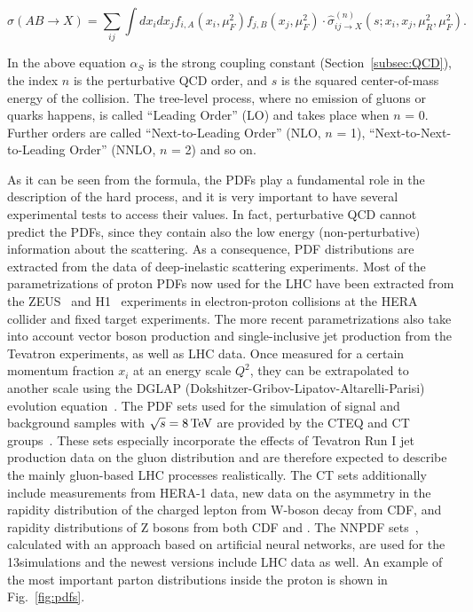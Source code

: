 \begin{equation}
\sigma(AB \to X) = \sum_{ij}\int dx_i dx_j f_{i,A}(x_i,\mu_F^2) f_{j,B}(x_j,\mu_F^2) \cdot \hat{\sigma}^{(n)}_{ij\to X}(s;x_i,x_j,\mu_R^2,\mu_F^2).
\end{equation}

In the above equation $\alpha_S$ is the strong coupling constant (Section~\ref{subsec:QCD}), the index $n$ is the perturbative QCD order, and $s$ is the squared center-of-mass energy of the collision.
The tree-level process, where no emission of gluons or quarks happens, is called ``Leading Order'' (LO) and takes place when $n$ = 0.
Further orders are called ``Next-to-Leading Order'' (NLO, $n$ = 1), ``Next-to-Next-to-Leading Order'' (NNLO, $n$ = 2) and so on.

As it can be seen from the formula, the PDFs play a fundamental role in the description of the hard process, and it is very important to have several experimental tests to access their values.
In fact, perturbative QCD cannot predict the PDFs, since they contain also the low energy (non-perturbative) information about the scattering.
As a consequence, PDF distributions are extracted from the data of deep-inelastic scattering experiments.
Most of the parametrizations of proton PDFs now used for the LHC have been extracted from the ZEUS~\cite{ZEUS:1993aa} and H1~\cite{ABT1997310} experiments in electron-proton collisions at the HERA collider and fixed target experiments.
The more recent parametrizations also take into account vector boson production and single-inclusive jet production from the Tevatron experiments, as well as LHC data.
Once measured for a certain momentum fraction $x_i$ at an energy scale $Q^2$, they can be extrapolated to another scale using the DGLAP (Dokshitzer-Gribov-Lipatov-Altarelli-Parisi) evolution equation~\cite{ALTARELLI1977298}.
The PDF sets used for the simulation of signal and background samples with $\sqrt{s} = 8\,\text{Te\hspace{-.08em}V}$ are provided by the CTEQ and CT groups~\cite{Pumplin:2002vw,Lai:2010vv}. These sets especially incorporate the effects of Tevatron Run I jet production data on the gluon distribution and are therefore expected to describe the mainly gluon-based LHC processes realistically. The CT sets additionally include measurements from HERA-1 data, new data on the asymmetry in the rapidity distribution of the charged lepton from W-boson decay from CDF, and rapidity distributions of Z bosons from both CDF and \DZERO. The NNPDF sets~\cite{Ball:2014uwa}, calculated with an approach based on artificial neural networks, are used for the 13\TeV simulations and the newest versions include LHC data as well.
An example of the most important parton distributions inside the proton is shown in Fig.~\ref{fig:pdfs}.\\

